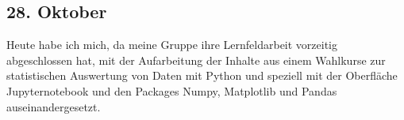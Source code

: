 \subsection{28. Oktober}
Heute habe ich mich, da meine Gruppe ihre Lernfeldarbeit vorzeitig abgeschlossen hat, mit der Aufarbeitung der Inhalte aus einem Wahlkurse zur statistischen Auswertung von Daten mit Python und speziell mit der Oberfläche Jupyternotebook und den Packages Numpy, Matplotlib und Pandas auseinandergesetzt.